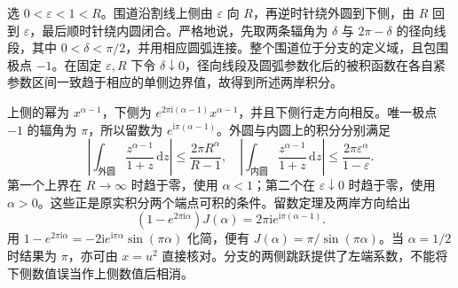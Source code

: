 \ProseParagraphBreak

选 \(0<\varepsilon<1<R\)。围道沿割线上侧由 \(\varepsilon\) 向 \(R\)，再逆时针绕外圆到下侧，由 \(R\) 回到 \(\varepsilon\)，最后顺时针绕内圆闭合。严格地说，先取两条辐角为 \(\delta\) 与 \(2\pi-\delta\) 的径向线段，其中 \(0<\delta<\pi/2\)，并用相应圆弧连接。整个围道位于分支的定义域，且包围极点 \(-1\)。在固定 \(\varepsilon,R\) 下令 \(\delta\downarrow0\)，径向线段及圆弧参数化后的被积函数在各自紧参数区间一致趋于相应的单侧边界值，故得到所述两岸积分。

\ProseParagraphBreak

上侧的幂为 \(x^{\alpha-1}\)，下侧为 \(e^{2\pi\mathrm{i}(\alpha-1)}x^{\alpha-1}\)，并且下侧行走方向相反。唯一极点 \(-1\) 的辐角为 \(\pi\)，所以留数为 \(e^{\mathrm{i}\pi(\alpha-1)}\)。外圆与内圆上的积分分别满足
\[
 \left|\int_{\text{外圆}}\frac{z^{\alpha-1}}{1+z}\,\mathrm{d}z\right|
 \le\frac{2\pi R^\alpha}{R-1},\quad
 \left|\int_{\text{内圆}}\frac{z^{\alpha-1}}{1+z}\,\mathrm{d}z\right|
 \le\frac{2\pi\varepsilon^\alpha}{1-\varepsilon}.
\]
第一个上界在 \(R\to\infty\) 时趋于零，使用 \(\alpha<1\)；第二个在 \(\varepsilon\downarrow0\) 时趋于零，使用 \(\alpha>0\)。这些正是原实积分两个端点可积的条件。留数定理及两岸方向给出
\[
 (1-e^{2\pi\mathrm{i}\alpha})J(\alpha)
 =2\pi\mathrm{i}e^{\mathrm{i}\pi(\alpha-1)}.
\]
用 \(1-e^{2\pi\mathrm{i}\alpha}=-2\mathrm{i}e^{\mathrm{i}\pi\alpha}\sin(\pi\alpha)\) 化简，便有 \(J(\alpha)=\pi/\sin(\pi\alpha)\)。当 \(\alpha=1/2\) 时结果为 \(\pi\)，亦可由 \(x=u^2\) 直接核对。分支的两侧跳跃提供了左端系数，不能将下侧数值误当作上侧数值后相消。

